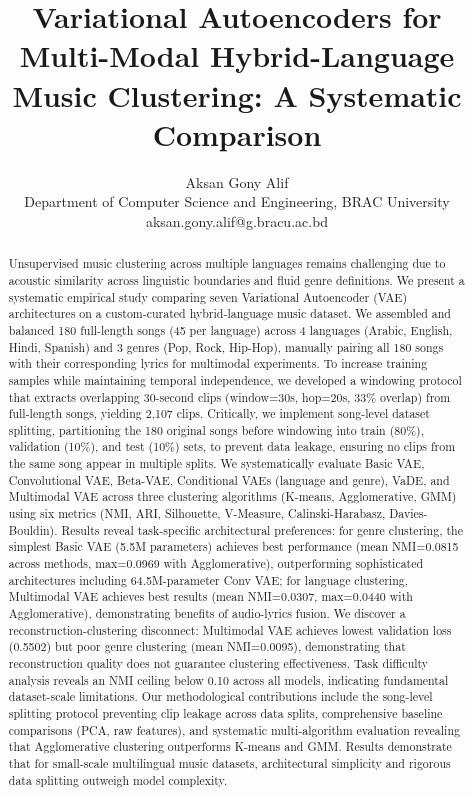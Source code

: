 \documentclass[10pt,twocolumn]{article}
\title{Variational Autoencoders for Multi-Modal Hybrid-Language Music Clustering: A Systematic Comparison}
\author{%
    Aksan Gony Alif \\
    Department of Computer Science and Engineering, BRAC University \\
    aksan.gony.alif@g.bracu.ac.bd
}
\begin{document}
\maketitle

\begin{abstract}
Unsupervised music clustering across multiple languages remains challenging due to acoustic similarity across linguistic boundaries and fluid genre definitions. We present a systematic empirical study comparing seven Variational Autoencoder (VAE) architectures on a custom-curated hybrid-language music dataset. We assembled and balanced 180 full-length songs (45 per language) across 4 languages (Arabic, English, Hindi, Spanish) and 3 genres (Pop, Rock, Hip-Hop), manually pairing all 180 songs with their corresponding lyrics for multimodal experiments. To increase training samples while maintaining temporal independence, we developed a windowing protocol that extracts overlapping 30-second clips (window=30s, hop=20s, 33\% overlap) from full-length songs, yielding 2,107 clips. Critically, we implement song-level dataset splitting, partitioning the 180 original songs before windowing into train (80\%), validation (10\%), and test (10\%) sets, to prevent data leakage, ensuring no clips from the same song appear in multiple splits. We systematically evaluate Basic VAE, Convolutional VAE, Beta-VAE, Conditional VAEs (language and genre), VaDE, and Multimodal VAE across three clustering algorithms (K-means, Agglomerative, GMM) using six metrics (NMI, ARI, Silhouette, V-Measure, Calinski-Harabasz, Davies-Bouldin). Results reveal task-specific architectural preferences: for genre clustering, the simplest Basic VAE (5.5M parameters) achieves best performance (mean NMI=0.0815 across methods, max=0.0969 with Agglomerative), outperforming sophisticated architectures including 64.5M-parameter Conv VAE; for language clustering, Multimodal VAE achieves best results (mean NMI=0.0307, max=0.0440 with Agglomerative), demonstrating benefits of audio-lyrics fusion. We discover a reconstruction-clustering disconnect: Multimodal VAE achieves lowest validation loss (0.5502) but poor genre clustering (mean NMI=0.0095), demonstrating that reconstruction quality does not guarantee clustering effectiveness. Task difficulty analysis reveals an NMI ceiling below 0.10 across all models, indicating fundamental dataset-scale limitations. Our methodological contributions include the song-level splitting protocol preventing clip leakage across data splits, comprehensive baseline comparisons (PCA, raw features), and systematic multi-algorithm evaluation revealing that Agglomerative clustering outperforms K-means and GMM. Results demonstrate that for small-scale multilingual music datasets, architectural simplicity and rigorous data splitting outweigh model complexity.
\end{abstract}
\end{document}
